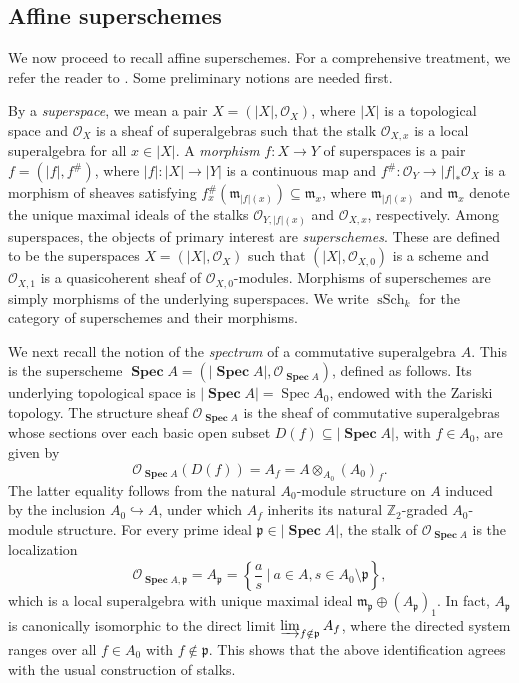 \documentclass[11pt,a4paper,reqno,noamsfonts]{amsart}
\numberwithin{equation}{section}
\theoremstyle{definition}
\theoremstyle{remark}
\newcommand{\Ocal}{\ensuremath{\mathscr{O}}}
\newcommand{\mfrak}{\ensuremath{\mathfrak{m}}}
\newcommand{\pfrak}{\ensuremath{\mathfrak{p}}}
\DeclareMathOperator{\Spec}{Spec}
\DeclareMathOperator{\sSpec}{\mathbf{Spec}}
\DeclareMathOperator{\sSch}{sSch}
\begin{document}
%
\subsection{Affine superschemes}\label{sec:2.2}
We now proceed to recall affine superschemes. For a comprehensive treatment, we refer the reader to \cite{Manin1988, Manin1991,CarmeliCastonFioresi2011, BruzzoHernandezRuiperezPolishchuk2023}. Some preliminary notions are needed first.

By a \emph{superspace}, we mean a pair $X=(\lvert X \rvert,\Ocal_X)$, where $\lvert X \rvert$ is a topological space and $\Ocal_X$ is a sheaf of superalgebras such that the stalk $\Ocal_{X,x}$ is a local superalgebra for all $x \in \lvert X \rvert$. A \emph{morphism} $f \colon X \to Y$ of superspaces is a pair $f=(\lvert f \rvert,f^{\#})$, where $\lvert f \rvert \colon \lvert X \rvert \to \lvert Y \rvert$ is a continuous map and $f^{\#} \colon \Ocal_Y\to \lvert f \rvert_*\Ocal_X$ is a morphism of sheaves satisfying $f_x^{\#}(\mfrak_{\lvert f \rvert (x)})\subseteq\mfrak_x$, where $\mfrak_{\lvert f \rvert(x)}$ and $\mfrak_x$ denote the unique maximal ideals of the stalks $\Ocal_{Y,\lvert f \rvert(x)}$ and $\Ocal_{X,x}$, respectively. Among superspaces, the objects of primary interest are \emph{superschemes}. These are defined to be the superspaces $X=(\lvert X\rvert,\Ocal_X)$ such that $(\lvert X \rvert,\Ocal_{X,0})$ is a scheme and $\Ocal_{X,1}$ is a quasicoherent sheaf of $\Ocal_{X,0}$-modules. Morphisms of superschemes are simply morphisms of the underlying superspaces. We write $\sSch_k$ for the category of superschemes and their morphisms.

We next recall the notion of the \emph{spectrum} of a commutative superalgebra $A$. This is the superscheme $\sSpec A = (\lvert \sSpec A \rvert, \Ocal_{\sSpec A})$, defined as follows. Its underlying topological space is $\lvert \sSpec A\rvert=\Spec A_0$, endowed with the Zariski topology. The structure sheaf $\Ocal_{\sSpec A}$ is the sheaf of commutative superalgebras whose sections over each basic open subset $D(f)\subseteq \lvert\sSpec A\rvert$, with $f\in A_0$, are given by
\begin{equation}
\Ocal_{\sSpec A} (D(f))=A_f=A\otimes_{A_0}(A_0)_f.
\end{equation}
The latter equality follows from the natural $A_0$-module structure on $A$ induced by the inclusion $A_0\hookrightarrow A$, under which $A_f$ inherits its natural $\mathbb Z_2$-graded $A_0$-module structure. For every prime ideal $\pfrak\in \lvert\sSpec A\rvert$, the stalk of $\Ocal_{\sSpec A}$ is the localization
\begin{equation}
\Ocal_{\sSpec A,\pfrak}= A_{\pfrak} =\left\{ \frac{a}{s} \: \Big\vert \: a\in A, s\in A_0\setminus\pfrak\right\},
\end{equation}
which is a local superalgebra with unique maximal ideal $\mfrak_{\pfrak} \oplus (A_{\pfrak})_1$. In fact, $A_{\pfrak}$ is canonically isomorphic to the direct limit $\varinjlim_{f\notin\pfrak}A_f$, where the directed system ranges over all $f\in A_0$ with $f\notin\pfrak$. This shows that the above identification agrees with the usual construction of stalks. 
\end{document}
